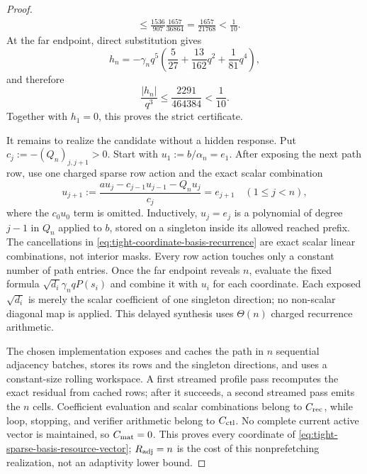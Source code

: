 \begin{proof}
\begin{align}
 &\leq\frac{1536}{907}\frac{1657}{36864}
 =\frac{1657}{21768}<\frac1{10}.
 \label{eq:tight-profile-interior-bound}
\end{align}
At the far endpoint, direct substitution gives
\begin{equation}
 h_n=-\gamma_n q^5
 \left(\frac5{27}+\frac{13}{162}q^2+\frac1{81}q^4\right),
 \label{eq:tight-profile-endpoint-residual}
\end{equation}
and therefore
\begin{equation}
 \frac{|h_n|}{q^3}
 \leq\frac{2291}{464384}<\frac1{10}.
 \label{eq:tight-profile-endpoint-bound}
\end{equation}
Together with $h_1=0$, this proves the strict certificate.

It remains to realize the candidate without a hidden response.  Put
$c_j:=-(Q_n)_{j,j+1}>0$.  Start with
$u_1:=b/\alpha_n=e_1$.  After exposing the next path row, use one charged
sparse row action and the exact scalar combination
\begin{equation}
 u_{j+1}:=
 \frac{a u_j-c_{j-1}u_{j-1}-Q_nu_j}{c_j}=e_{j+1}
 \quad(1\leq j<n),
 \label{eq:tight-coordinate-basis-recurrence}
\end{equation}
where the $c_0u_0$ term is omitted.  Inductively, $u_j=e_j$ is a polynomial
of degree $j-1$ in $Q_n$ applied to $b$, stored on a singleton inside its
allowed reached prefix.  The cancellations in
\cref{eq:tight-coordinate-basis-recurrence} are exact scalar linear
combinations, not interior masks.  Every row action touches only a constant
number of path entries.  Once the far endpoint reveals $n$, evaluate the
fixed formula
$\sqrt{d_i}\gamma_nqP(s_i)$ and combine it with $u_i$ for each coordinate.
Each exposed $\sqrt{d_i}$ is merely the scalar coefficient of one singleton
direction; no non-scalar diagonal map is applied.
This delayed synthesis uses $\Theta(n)$ charged recurrence arithmetic.

The chosen implementation exposes and caches the path in $n$ sequential
adjacency batches, stores its rows and the singleton directions, and uses a
constant-size rolling workspace.  A first streamed profile pass recomputes
the exact residual from cached rows; after it succeeds, a second streamed pass
emits the $n$ cells.  Coefficient evaluation and scalar combinations belong
to $C_{\rm rec}$, while loop, stopping, and verifier arithmetic belong to
$C_{\rm ctl}$.  No complete current active vector is maintained, so
$C_{\rm mat}=0$.  This proves every coordinate of
\cref{eq:tight-sparse-basis-resource-vector}; $R_{\rm adj}=n$ is the cost of
this nonprefetching realization, not an adaptivity lower bound.


\end{proof}
